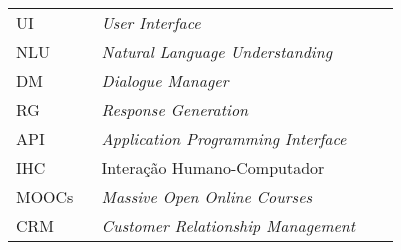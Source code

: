 

\begin{listaacron}

\begin{longtable}[l]{p{0.2\linewidth}p{0.7\linewidth}}
UI & \it{User Interface}\\
NLU & \it{Natural Language Understanding}\\
DM & \it{Dialogue Manager}\\
RG & \it{Response Generation}\\
API & \it{Application Programming Interface}\\
IHC & Interação Humano-Computador\\
MOOCs & \it{Massive Open Online Courses}\\
CRM & \it{Customer Relationship Management}\\
\end{longtable}

\end{listaacron}

